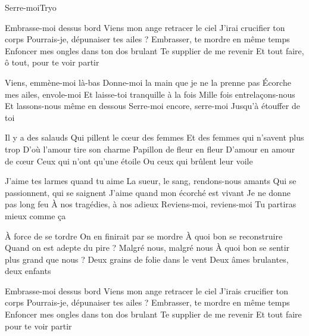 \begin{Song}{Serre-moi}{Tryo}
\begin{multicols}{2}

\espaceInterStrophe

\begin{Verse}
Embrasse-moi dessus bord
Viens mon ange retracer le ciel
J'irai crucifier ton corps
Pourrais-je, dépunaiser tes ailes ?
Embrasser, te mordre en même temps
Enfoncer mes ongles dans ton dos brulant
Te supplier de me revenir
Et tout faire, ô tout, pour te voir partir
\espaceInterStrophe

Viens, emmène-moi là-bas
Donne-moi la main que je ne la prenne pas
Écorche mes ailes, envole-moi
Et laisse-toi tranquille à la fois
Mille fois entrelaçons-nous
Et lassons-nous même en dessous
Serre-moi encore, serre-moi
Jusqu'à étouffer de toi
\end{Verse}
\espaceInterStrophe

\begin{Chorus}
Il y a des salauds
Qui pillent le cœur des femmes
Et des femmes qui n'savent plus trop
D'où l'amour tire son charme
Papillon de fleur en fleur
D'amour en amour de cœur
Ceux qui n'ont qu'une étoile
Ou ceux qui brûlent leur voile
\end{Chorus}
\espaceInterStrophe

\espaceInterStrophe

\begin{Verse}
J'aime tes larmes quand tu aime
La sueur, le sang, rendons-nous amants
Qui se passionnent, qui se saignent
J'aime quand mon écorché est vivant
Je ne donne pas long feu
À nos tragédies, à nos adieux
Reviens-moi, reviens-moi
Tu partiras mieux comme ça
\columnbreak

À force de se tordre
On en finirait par se mordre
À quoi bon se reconstruire
Quand on est adepte du pire ?
Malgré nous, malgré nous
À quoi bon se sentir plus grand que nous ?
Deux grains de folie dans le vent
Deux âmes brulantes, deux enfants
\end{Verse}
\espaceInterStrophe

\aurefrain
\espaceInterStrophe

\begin{Verse}
Embrasse-moi dessus bord
Viens mon ange retracer le ciel
J'irais crucifier ton corps
Pourrais-je, dépunaiser tes ailes ?
Embrasser, te mordre en même temps
Enfoncer mes ongles dans ton dos brulant
Te supplier de me revenir
Et tout faire pour te voir partir
\espaceInterStrophe


\end{Verse}
\end{multicols}
\end{Song}
